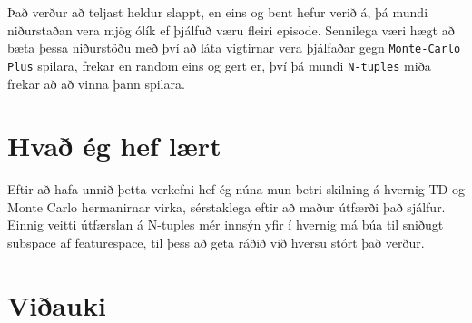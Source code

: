 \documentclass[12pt]{article}
\begin{document}
Það verður að teljast heldur slappt, en eins og bent hefur verið á, þá mundi
niðurstaðan vera mjög ólík ef þjálfuð væru fleiri episode. Sennilega
væri hægt að bæta þessa niðurstöðu með því að láta vigtirnar vera þjálfaðar
gegn \verb|Monte-Carlo Plus| spilara, frekar en random eins og gert er,
því þá mundi \verb|N-tuples| miða frekar að að vinna þann spilara.


\section{Hvað ég hef lært}
Eftir að hafa unnið þetta verkefni hef ég núna mun betri skilning á hvernig TD og Monte Carlo
hermanirnar virka, sérstaklega eftir að maður útfærði það sjálfur. Einnig veitti
útfærslan á N-tuples mér innsýn yfir í hvernig má búa til sniðugt subspace
af featurespace, til þess að geta ráðið við hversu stórt það verður.

\section{Viðauki}
\inputminted{python}{../connect4.py}
\inputminted{python}{../util.py}
\end{document}
